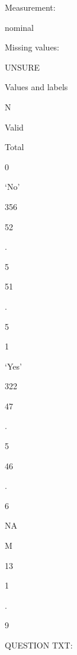 \documentclass[
  letterpaper,
]{scrbook}
\begin{document}
\begin{enumerate}
\begin{enumerate}
\begin{enumerate}
\begin{enumerate}
\begin{enumerate}
\begin{enumerate}
\begin{enumerate}
\begin{enumerate}
\begin{enumerate}
\begin{enumerate}
\begin{enumerate}
\begin{enumerate}
\begin{enumerate}
                          Measurement:

                          nominal

                          Missing values:

                          UNSURE

                          Values and labels

                          N

                          Valid

                          Total

                          0

                          `No'

                          356

                          52

                          .

                          5

                          51

                          .

                          5

                          1

                          `Yes'

                          322

                          47

                          .

                          5

                          46

                          .

                          6

                          NA

                          M

                          13

                          1

                          .

                          9

                          QUESTION TXT:


\end{enumerate}
\end{enumerate}
\end{enumerate}
\end{enumerate}
\end{enumerate}
\end{enumerate}
\end{enumerate}
\end{enumerate}
\end{enumerate}
\end{enumerate}
\end{enumerate}
\end{enumerate}
\end{enumerate}
\end{document}
